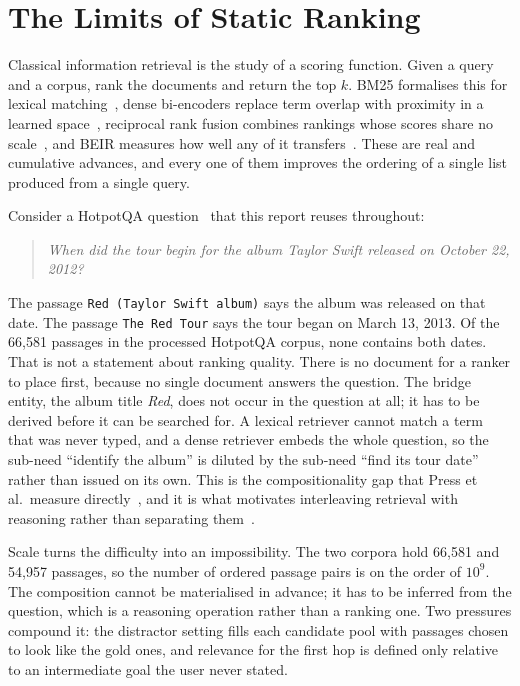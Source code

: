\section{The Limits of Static Ranking}

Classical information retrieval is the study of a scoring function. Given a
query and a corpus, rank the documents and return the top $k$. BM25 formalises
this for lexical matching~\cite{robertson2009probabilistic}, dense bi-encoders
replace term overlap with proximity in a learned space~\cite{xiao2023cpack},
reciprocal rank fusion combines rankings whose scores share no
scale~\cite{cormack2009reciprocal}, and BEIR measures how well any of it
transfers~\cite{thakur2021beir}. These are real and cumulative advances, and
every one of them improves the ordering of a single list produced from a
single query.

Consider a HotpotQA question~\cite{yang2018hotpotqa} that this report reuses
throughout:

\begin{quote}
\textit{When did the tour begin for the album Taylor Swift released on
October 22, 2012?}
\end{quote}

\noindent The passage \texttt{Red (Taylor Swift album)} says the album was
released on that date. The passage \texttt{The Red Tour} says the tour began on
March 13, 2013. Of the 66{,}581 passages in the processed HotpotQA corpus, none
contains both dates. That is not a statement about ranking quality. There is no
document for a ranker to place first, because no single document answers the
question. The bridge entity, the album title \textit{Red}, does not occur in
the question at all; it has to be derived before it can be searched for. A
lexical retriever cannot match a term that was never typed, and a dense
retriever embeds the whole question, so the sub-need ``identify the album'' is
diluted by the sub-need ``find its tour date'' rather than issued on its own.
This is the compositionality gap that Press et al.\ measure
directly~\cite{press2023selfask}, and it is what motivates interleaving
retrieval with reasoning rather than separating them~\cite{trivedi2023interleaving}.

Scale turns the difficulty into an impossibility. The two corpora hold
66{,}581 and 54{,}957 passages, so the number of ordered passage pairs is on
the order of $10^9$. The composition cannot be materialised in advance; it has
to be inferred from the question, which is a reasoning operation rather than a
ranking one. Two pressures compound it: the distractor setting fills each
candidate pool with passages chosen to look like the gold ones, and relevance
for the first hop is defined only relative to an intermediate goal the user
never stated.

